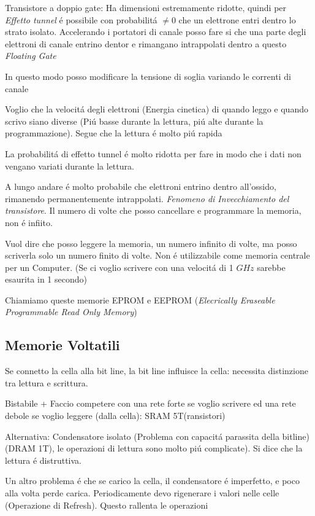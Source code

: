 \documentclass{article}
\begin{document}
Transistore a doppio gate: Ha dimensioni estremamente ridotte, quindi per \textit{Effetto tunnel} \'e possibile con probabilit\'a $\neq 0$ che un elettrone entri dentro lo strato isolato. Accelerando i portatori di canale posso fare si che una parte degli elettroni di canale entrino dentor e rimangano intrappolati dentro a questo \textit{Floating Gate}

In questo modo posso modificare la tensione di soglia variando le correnti di canale

Voglio che la velocit\'a degli elettroni (Energia cinetica)  di quando leggo e quando scrivo siano diverse (Pi\'u basse durante la lettura, pi\'u alte durante la programmazione). Segue che la lettura \'e molto pi\'u rapida

La probabilit\'a di effetto tunnel \'e molto ridotta per fare in modo che i dati non vengano variati durante la lettura.

A lungo andare \'e molto probabile che elettroni entrino dentro all'ossido, rimanendo permanentemente intrappolati. \textit{Fenomeno di Invecchiamento del transistore}. Il numero di volte che posso cancellare e programmare la memoria, non \'e infiito.

Vuol dire che posso leggere la memoria, un numero infinito di volte, ma posso scriverla solo un numero finito di volte. Non \'e utilizzabile come memoria centrale per un Computer. (Se ci voglio scrivere con una velocit\'a di 1 $GHz$ sarebbe esaurita in 1 secondo)

Chiamiamo queste memorie EPROM e  EEPROM (\textit{Elecrically Eraseable Programmable Read Only Memory})

\subsection{Memorie Voltatili}

Se connetto la cella alla bit line, la bit line influisce la cella: necessita distinzione tra lettura e scrittura.

Bistabile + Faccio competere con una rete forte se voglio scrivere ed una rete debole se voglio leggere (dalla cella): SRAM 5T(ransistori)

Alternativa: Condensatore isolato (Problema con capacit\'a parassita della bitline) (DRAM 1T), le operazioni di lettura sono molto pi\'u complicate). Si dice che la lettura \'e distruttiva.

Un altro problema \'e che se carico la cella, il condensatore \'e imperfetto, e poco alla volta perde carica. Periodicamente devo rigenerare i valori nelle celle (Operazione di Refresh). Questo rallenta le operazioni
\end{document}
